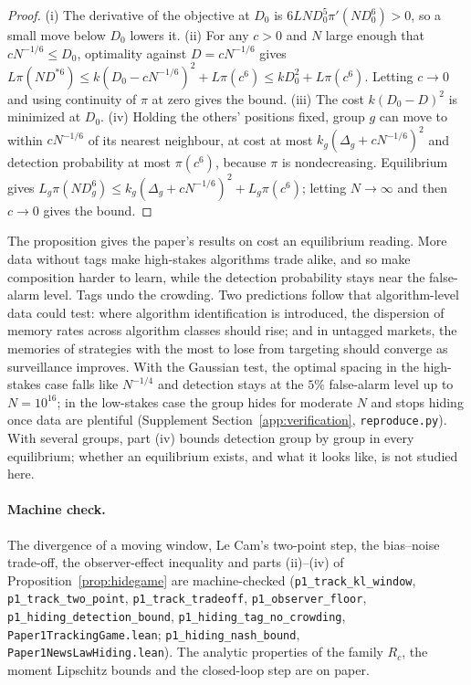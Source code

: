 \documentclass[12pt]{article}
\theoremstyle{definition}
\theoremstyle{remark}
\begin{document}
\begin{proof}
(i) The derivative of the objective at $D_0$ is $6LND_0^5\pi'(ND_0^6)>0$, so a small move below $D_0$ lowers it. (ii) For any $c>0$ and $N$ large enough that $cN^{-1/6}\le D_0$, optimality against $D=cN^{-1/6}$ gives $L\pi(ND^{*6})\le k(D_0-cN^{-1/6})^2+L\pi(c^6)\le kD_0^2+L\pi(c^6)$. Letting $c\to0$ and using continuity of $\pi$ at zero gives the bound. (iii) The cost $k(D_0-D)^2$ is minimized at $D_0$. (iv) Holding the others' positions fixed, group $g$ can move to within $cN^{-1/6}$ of its nearest neighbour, at cost at most $k_g(\Delta_g+cN^{-1/6})^2$ and detection probability at most $\pi(c^6)$, because $\pi$ is nondecreasing. Equilibrium gives $L_g\pi(ND_g^6)\le k_g(\Delta_g+cN^{-1/6})^2+L_g\pi(c^6)$; letting $N\to\infty$ and then $c\to0$ gives the bound.
\end{proof}

The proposition gives the paper's results on cost an equilibrium reading. More data without tags make high-stakes algorithms trade alike, and so make composition harder to learn, while the detection probability stays near the false-alarm level. Tags undo the crowding. Two predictions follow that algorithm-level data could test: where algorithm identification is introduced, the dispersion of memory rates across algorithm classes should rise; and in untagged markets, the memories of strategies with the most to lose from targeting should converge as surveillance improves. With the Gaussian test, the optimal spacing in the high-stakes case falls like $N^{-1/4}$ and detection stays at the $5\%$ false-alarm level up to $N=10^{16}$; in the low-stakes case the group hides for moderate $N$ and stops hiding once data are plentiful (Supplement Section~\ref{app:verification}, \nolinkurl{reproduce.py}). With several groups, part (iv) bounds detection group by group in every equilibrium; whether an equilibrium exists, and what it looks like, is not studied here.

\paragraph{Machine check.} The divergence of a moving window, Le Cam's two-point step, the bias--noise trade-off, the observer-effect inequality and parts (ii)--(iv) of Proposition~\ref{prop:hidegame} are machine-checked (\texttt{p1\_track\_kl\_window}, \texttt{p1\_track\_two\_point}, \texttt{p1\_track\_tradeoff}, \texttt{p1\_observer\_floor}, \texttt{p1\_hiding\_detection\_bound}, \texttt{p1\_hiding\_tag\_no\_crowding}, \nolinkurl{Paper1TrackingGame.lean}; \texttt{p1\_hiding\_nash\_bound}, \nolinkurl{Paper1NewsLawHiding.lean}). The analytic properties of the family $R_c$, the moment Lipschitz bounds and the closed-loop step are on paper.
\end{document}
